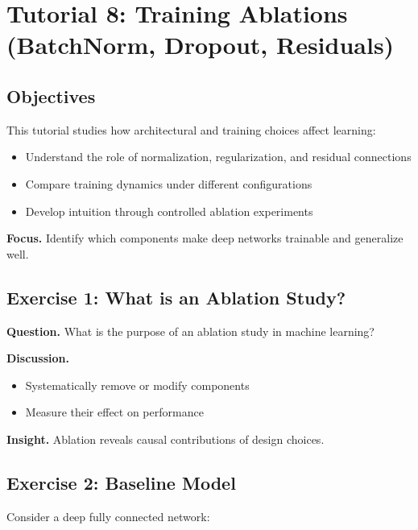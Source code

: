 \section{Tutorial 8: Training Ablations (BatchNorm, Dropout, Residuals)}

\subsection{Objectives}

This tutorial studies how architectural and training choices affect learning:

\begin{itemize}
    \item Understand the role of normalization, regularization, and residual connections
    \item Compare training dynamics under different configurations
    \item Develop intuition through controlled ablation experiments
\end{itemize}

\medskip

\noindent
\textbf{Focus.}  
Identify which components make deep networks trainable and generalize well.

\subsection{Exercise 1: What is an Ablation Study?}

\textbf{Question.}  
What is the purpose of an ablation study in machine learning?

\medskip

\noindent
\textbf{Discussion.}

\begin{itemize}
    \item Systematically remove or modify components
    \item Measure their effect on performance
\end{itemize}

\medskip

\noindent
\textbf{Insight.}  
Ablation reveals causal contributions of design choices.

\subsection{Exercise 2: Baseline Model}

Consider a deep fully connected network:

